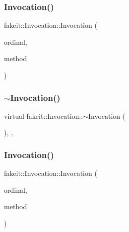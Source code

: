 \subsubsection{\texorpdfstring{Invocation()}{Invocation()}\hspace{0.1cm}{\footnotesize\ttfamily [2/9]}}
{\footnotesize\ttfamily fakeit\+::\+Invocation\+::\+Invocation (\begin{DoxyParamCaption}\item[{unsigned int}]{ordinal,  }\item[{\mbox{\hyperlink{structfakeit_1_1MethodInfo}{Method\+Info}} \&}]{method }\end{DoxyParamCaption})\hspace{0.3cm}{\ttfamily [inline]}}

\mbox{\label{structfakeit_1_1Invocation_a027b5d4605055387939c6e37cb01a427}} 
\subsubsection{\texorpdfstring{$\sim$Invocation()}{~Invocation()}\hspace{0.1cm}{\footnotesize\ttfamily [2/9]}}
{\footnotesize\ttfamily virtual fakeit\+::\+Invocation\+::$\sim$\+Invocation (\begin{DoxyParamCaption}{ }\end{DoxyParamCaption})\hspace{0.3cm}{\ttfamily [override]}, {\ttfamily [virtual]}, {\ttfamily [default]}}

\mbox{\label{structfakeit_1_1Invocation_a65e80c1f6eb1c04f7e6c48df5bd229a6}} 
\subsubsection{\texorpdfstring{Invocation()}{Invocation()}\hspace{0.1cm}{\footnotesize\ttfamily [3/9]}}
{\footnotesize\ttfamily fakeit\+::\+Invocation\+::\+Invocation (\begin{DoxyParamCaption}\item[{unsigned int}]{ordinal,  }\item[{\mbox{\hyperlink{structfakeit_1_1MethodInfo}{Method\+Info}} \&}]{method }\end{DoxyParamCaption})\hspace{0.3cm}{\ttfamily [inline]}}

